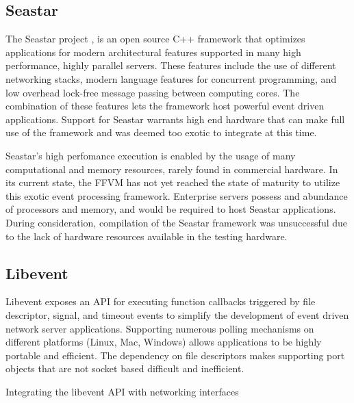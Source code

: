 \subsection{Seastar}
\label{related:seastar}
The Seastar project \cite{seastar}, is an open source C++ framework that
optimizes applications for modern architectural features supported in many high
performance, highly parallel servers. These features include the use of different
networking stacks, modern language features for concurrent programming, and low
overhead lock-free message passing between computing cores. The combination of
these features lets the framework host powerful event driven applications.
Support for Seastar warrants high end hardware that can make full use of the
framework and was deemed too exotic to integrate at this time.

Seastar's high perfomance execution is enabled by the usage of many computational and memory resources, rarely found in commercial hardware. In its current state, the FFVM has not yet reached the state of maturity to utilize this exotic event processing framework. Enterprise servers possess and abundance of processors and memory, and would be required to host Seastar applications. During consideration, compilation of the Seastar framework was unsuccessful due to the lack of hardware resources available in the testing hardware.

\subsection{Libevent}
\label{related:libevent}
Libevent \cite{libevent} exposes an API for executing function callbacks
triggered by file descriptor, signal, and timeout events to simplify the
development of event driven network server applications. Supporting numerous
polling mechanisms on different platforms (Linux, Mac, Windows) allows
applications to be highly portable and efficient. The dependency on file
descriptors makes supporting port objects that are not socket based difficult
and inefficient.

Integrating the libevent API with networking interfaces 